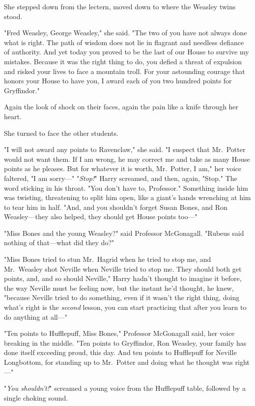 She stepped down from the lectern, moved down to where the Weasley twins stood.

"Fred Weasley, George Weasley," she said. "The two of you have not always done
what is right. The path of wisdom does not lie in flagrant and needless
defiance of authority. And yet today you proved to be the last of our House to
survive my mistakes. Because it was the right thing to do, you defied a threat
of expulsion and risked your lives to face a mountain troll. For your
astounding courage that honors your House to have you, I award each of you two
hundred points for Gryffindor."

Again the look of shock on their faces, again the pain like a knife through her
heart.

She turned to face the other students.

"I will not award any points to Ravenclaw," she said. "I suspect that
Mr.~Potter would not want them. If I am wrong, he may correct me and take as
many House points as he pleases. But for whatever it is worth, Mr.~Potter, I
am," her voice faltered, "I am sorry—"
\sbreak
"\emph{Stop!}" Harry screamed, and then, again, "Stop." The word sticking in
his throat. "You don't have to, Professor." Something inside him was twisting,
threatening to split him open, like a giant's hands wrenching at him to tear
him in half. "And, and you shouldn't forget Susan Bones, and Ron Weasley—they
also helped, they should get House points too—"

"Miss Bones and the young Weasley?" said Professor McGonagall. "Rubeus said
nothing of that—what did they do?"

"\emph{}Miss Bones tried to stun Mr.~Hagrid when he tried to stop me, and
Mr.~Weasley shot Neville when Neville tried to stop me. They should both get
points, and, and so should Neville," Harry hadn't thought to imagine it before,
the way Neville must be feeling now, but the instant he'd thought, he knew,
"because Neville tried to do something, even if it wasn't the right thing,
doing what's right is the \emph{second} lesson, you can start practicing that
after you learn to do anything at all—"

"Ten points to Hufflepuff, Miss Bones," Professor McGonagall said, her voice
breaking in the middle. "Ten points to Gryffindor, Ron Weasley, your family has
done itself exceeding proud, this day. And ten points to Hufflepuff for Neville
Longbottom, for standing up to Mr.~Potter and doing what he thought was
right—"

"\emph{You shouldn't!}" screamed a young voice from the Hufflepuff table,
followed by a single choking sound.

